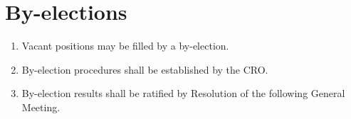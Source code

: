 \section{By-elections}
\label{by-elections}

\begin{enumerate}
 \item Vacant positions may be filled by a by-election.
 \item By-election procedures shall be established by the CRO.
 \item By-election results shall be ratified by Resolution of the following General Meeting.
\end{enumerate}
